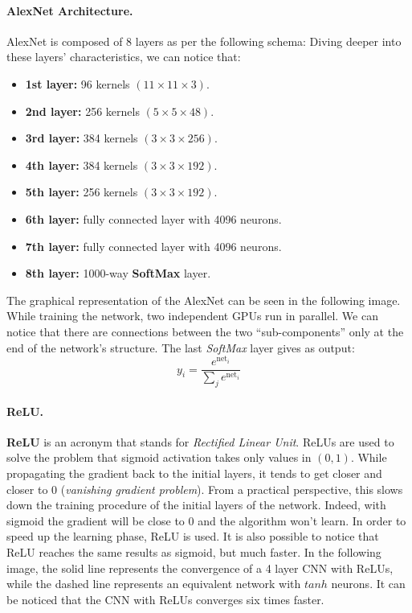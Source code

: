 \paragraph*{AlexNet Architecture.} AlexNet is composed of 8 layers as per the following schema:
Diving deeper into these layers' characteristics, we can notice that:
\begin{itemize}
	\item \textbf{1st layer:} 96 kernels $(11 \times 11 \times 3)$.
	\item \textbf{2nd layer:} 256 kernels $(5 \times 5 \times 48)$.
	\item \textbf{3rd layer:} 384 kernels $(3 \times 3 \times 256)$.
	\item \textbf{4th layer:} 384 kernels $(3 \times 3 \times 192)$.
	\item \textbf{5th layer:} 256 kernels $(3 \times 3 \times 192)$.
	\item \textbf{6th layer:} fully connected layer with 4096 neurons.
	\item \textbf{7th layer:} fully connected layer with 4096 neurons.
	\item \textbf{8th layer:} 1000-way \textbf{SoftMax} layer.
\end{itemize}
The graphical representation of the AlexNet can be seen in the following image. While training the network, two independent GPUs run in parallel. We can notice that there are connections between the two ``sub-components'' only at the end of the network's structure. The last \textit{SoftMax} layer gives as output:
$$y_i = \frac{e^{\text{net}_i}}{\sum_j e^{\text{net}_i}}$$

\paragraph*{ReLU.} \textbf{ReLU} is an acronym that stands for \textit{Rectified Linear Unit}. ReLUs are used to solve the problem that sigmoid activation takes only values in $(0,1)$. While propagating the gradient back to the initial layers, it tends to get closer and closer to $0$ (\textit{vanishing gradient problem}). From a practical perspective, this slows down the training procedure of the initial layers of the network. Indeed, with sigmoid the gradient will be close to 0 and the algorithm won't learn. In order to speed up the learning phase, ReLU is used.
It is also possible to notice that ReLU reaches the same results as sigmoid, but much faster. In the following image, the solid line represents the convergence of a 4 layer CNN with ReLUs, while the dashed line represents an equivalent network with $tanh$ neurons. It can be noticed that the CNN with ReLUs converges six times faster.

